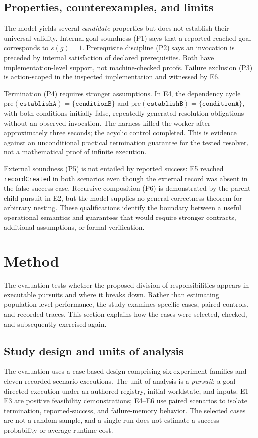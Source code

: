 \documentclass[11pt]{article}
\begin{document}
\subsection{Properties, counterexamples, and limits}
The model yields several \emph{candidate} properties but does not establish their universal validity. Internal goal soundness (P1) says that a reported reached goal corresponds to $s(g)=1$. Prerequisite discipline (P2) says an invocation is preceded by internal satisfaction of declared prerequisites. Both have implementation-level support, not machine-checked proofs. Failure exclusion (P3) is action-scoped in the inspected implementation and witnessed by E6.

Termination (P4) requires stronger assumptions. In E4, the dependency cycle $\mathrm{pre}(\texttt{establishA})=\{\texttt{conditionB}\}$ and $\mathrm{pre}(\texttt{establishB})=\{\texttt{conditionA}\}$, with both conditions initially false, repeatedly generated resolution obligations without an observed invocation. The harness killed the worker after approximately three seconds; the acyclic control completed. This is evidence against an unconditional practical termination guarantee for the tested resolver, not a mathematical proof of infinite execution.

External soundness (P5) is not entailed by reported success: E5 reached \texttt{recordCreated} in both scenarios even though the external record was absent in the false-success case. Recursive composition (P6) is demonstrated by the parent--child pursuit in E2, but the model supplies no general correctness theorem for arbitrary nesting. These qualifications identify the boundary between a useful operational semantics and guarantees that would require stronger contracts, additional assumptions, or formal verification.

\section{Method}
The evaluation tests whether the proposed division of responsibilities appears in executable pursuits and where it breaks down. Rather than estimating population-level performance, the study examines specific cases, paired controls, and recorded traces. This section explains how the cases were selected, checked, and subsequently exercised again.

\subsection{Study design and units of analysis}
The evaluation uses a case-based design comprising six experiment families and eleven recorded scenario executions. The unit of analysis is a \emph{pursuit}: a goal-directed execution under an authored registry, initial worldstate, and inputs. E1--E3 are positive feasibility demonstrations; E4--E6 use paired scenarios to isolate termination, reported-success, and failure-memory behavior. The selected cases are not a random sample, and a single run does not estimate a success probability or average runtime cost.
\end{document}
